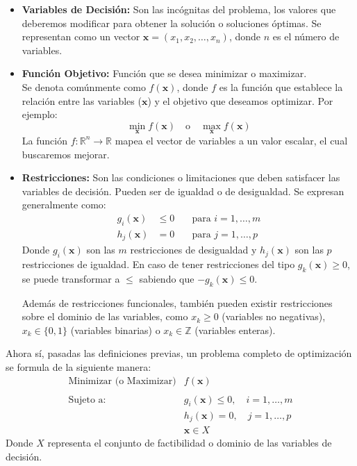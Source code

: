 \documentclass[12pt,a4paper]{book}
\begin{document}
\begin{itemize}
    \item \textbf{Variables de Decisión:} Son las incógnitas del problema, los valores que deberemos modificar para obtener la solución o soluciones óptimas. Se representan como un vector $\mathbf{x} = (x_1, x_2, \ldots, x_n)$, donde $n$ es el número de variables.

    \item \textbf{Función Objetivo:} Función que se desea minimizar o maximizar.\\
    Se denota comúnmente como $f(\mathbf{x})$, donde $f$ es la función que establece la relación entre las variables ($\mathbf{x}$) y el objetivo que deseamos optimizar.
    Por ejemplo:
    $$ \min_{\mathbf{x}} f(\mathbf{x}) \quad \text{o} \quad \max_{\mathbf{x}} f(\mathbf{x}) $$
    La función $f: \mathbb{R}^n \to \mathbb{R}$ mapea el vector de variables a un valor escalar, el cual buscaremos mejorar.

    \item \textbf{Restricciones:} Son las condiciones o limitaciones que deben satisfacer las variables de decisión. Pueden ser de igualdad o de desigualdad. Se expresan generalmente como:
    \begin{align*}
        g_i(\mathbf{x}) &\le 0 & \quad \text{para } i = 1, \ldots, m \\
        h_j(\mathbf{x}) &= 0 & \quad \text{para } j = 1, \ldots, p
    \end{align*}
    Donde $g_i(\mathbf{x})$ son las $m$ restricciones de desigualdad y $h_j(\mathbf{x})$ son las $p$ restricciones de igualdad.
    En caso de tener restricciones del tipo $g_k(\mathbf{x})\geq0$, se puede transformar a $\leq$ sabiendo que $-g_k(\mathbf{x}) \leq 0$.
    
    Además de restricciones funcionales, también pueden existir restricciones sobre el dominio de las variables, como $x_k \ge 0$ (variables no negativas),  $x_k \in \{0,1\}$ (variables binarias) o $x_k \in \mathbb{Z}$ (variables enteras).
\end{itemize}

Ahora sí, pasadas las definiciones previas, un problema completo de optimización se formula de la siguiente manera:
$$
\begin{array}{ll}
\text{Minimizar (o Maximizar)} & f(\mathbf{x}) \\ \\
\text{Sujeto a:} & g_i(\mathbf{x}) \le 0, \quad i = 1, \ldots, m \\
& h_j(\mathbf{x}) = 0, \quad j = 1, \ldots, p \\
& \mathbf{x} \in X
\end{array}
$$
Donde $X$ representa el conjunto de factibilidad o dominio de las variables de decisión.
\end{document}
